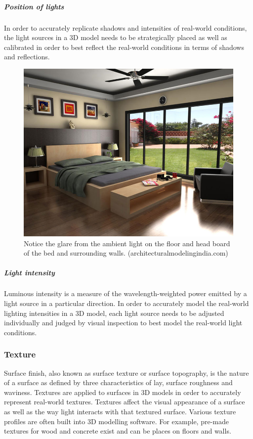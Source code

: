 \documentclass[11pt,a4paper]{report}
\begin{document}
					\subparagraph{Position of lights}
						In order to accurately replicate shadows and intensities of real-world conditions, the light sources in a 3D model needs to be strategically placed as well as calibrated in order to best reflect the real-world conditions in terms of shadows and reflections.
						
						\begin{figure}[H]
							\centering
							\includegraphics[width=1\textwidth]{light_glare}
							\caption[Light glare]{Notice the glare from the ambient light on the floor and head board of the bed and surrounding walls. (architecturalmodelingindia.com)}
						\end{figure}
					
					\subparagraph{Light intensity}
						Luminous intensity is a measure of the wavelength-weighted power emitted by a light source in a particular direction. In order to accurately model the real-world lighting intensities in a 3D model, each light source needs to be adjusted individually and judged by visual inspection to best model the real-world light conditions.
						
			\subsubsection{Texture}
				Surface finish, also known as surface texture or surface topography, is the nature of a surface as defined by three characteristics of lay, surface roughness and waviness.
				\parencite{e._paul_degarmo_materials_2003}
				Textures are applied to surfaces in 3D models in order to accurately represent real-world textures. Textures affect the visual appearance of a surface as well as the way light interacts with that textured surface. Various texture profiles are often built into 3D modelling software. For example, pre-made textures for wood and concrete exist and can be places on floors and walls.
			
\end{document}
